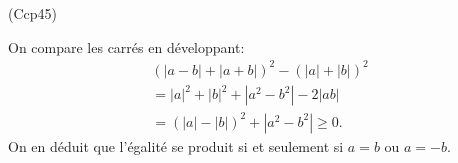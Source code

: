 \begin{tiny}(Ccp45)\end{tiny}
On compare les carrés en développant:
\begin{multline*}
  (|a-b| + |a+b|)^2 - (|a|+|b|)^2 \\
  = |a|^2 + |b|^2 + |a^2 - b^2| - 2|ab| \\
  =(|a| - |b|)^2 + |a^2 - b^2| \geq 0.
\end{multline*}
On en déduit que l'égalité se produit si et seulement si $a=b$ ou $a = -b$.
